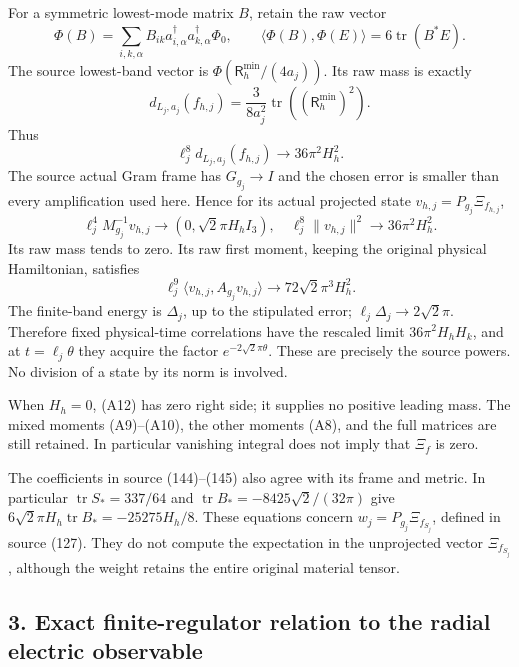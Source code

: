 \documentclass[
  11pt,
]{article}
\begin{document}
For a symmetric lowest-mode matrix \(B\), retain the raw vector \[
 \Phi(B)=\sum_{i,k,\alpha}B_{ik}
     a_{i,\alpha}^\dagger a_{k,\alpha}^\dagger\Phi_0,
 \qquad \langle\Phi(B),\Phi(E)\rangle=6\operatorname{tr}(B^*E).
\tag{A11}
\] The source lowest-band vector is \(\Phi(\mathsf R_h^{\min}/(4a_j))\).
Its raw mass is exactly \[
 d_{L_j,a_j}(f_{h,j})=\frac3{8a_j^2}
                      \operatorname{tr}((\mathsf R_h^{\min})^2).
\] Thus \[
 \ell_j^8d_{L_j,a_j}(f_{h,j})\longrightarrow36\pi^2H_h^2.
\tag{A12}
\] The source actual Gram frame has \(G_{g_j}\to I\) and the chosen
error is smaller than every amplification used here. Hence for its
actual projected state \(v_{h,j}=P_{g_j}\Xi_{f_{h,j}}\), \[
 \ell_j^4M_{g_j}^{-1}v_{h,j}\longrightarrow
 (0,\sqrt2\pi H_h I_3),\quad
 \ell_j^8\|v_{h,j}\|^2\longrightarrow36\pi^2H_h^2.
\tag{A13}
\] Its raw mass tends to zero. Its raw first moment, keeping the
original physical Hamiltonian, satisfies \[
 \ell_j^9\langle v_{h,j},A_{g_j}v_{h,j}\rangle
 \longrightarrow72\sqrt2\pi^3H_h^2.
\tag{A14}
\] The finite-band energy is \(\Delta_j\), up to the stipulated error;
\(\ell_j\Delta_j\to2\sqrt2\pi\). Therefore fixed physical-time
correlations have the rescaled limit \(36\pi^2H_hH_k\), and at
\(t=\ell_j\theta\) they acquire the factor \(e^{-2\sqrt2\pi\theta}\).
These are precisely the source powers. No division of a state by its
norm is involved.

When \(H_h=0\), (A12) has zero right side; it supplies no positive
leading mass. The mixed moments (A9)--(A10), the other moments (A8), and
the full matrices are still retained. In particular vanishing integral
does not imply that \(\Xi_f\) is zero.

The coefficients in source (144)--(145) also agree with its frame and
metric. In particular \(\operatorname{tr}S_*=337/64\) and
\(\operatorname{tr}B_*=-8425\sqrt2/(32\pi)\) give
\(6\sqrt2\pi H_h\operatorname{tr}B_*=-25275H_h/8\). These equations
concern \(w_j=P_{g_j}\Xi_{f_{S_j}}\), defined in source (127). They do
not compute the expectation in the unprojected vector \(\Xi_{f_{S_j}}\),
although the weight retains the entire original material tensor.

\subsection{3. Exact finite-regulator relation to the radial electric
observable}\label{weak-coupling-part-10-exact-finite-regulator-relation-to-the-radial-electric-observable}
\end{document}
